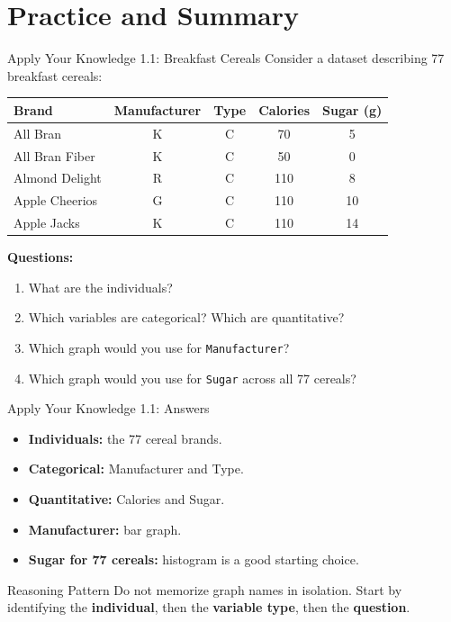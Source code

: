 \documentclass[aspectratio=169]{beamer}
\begin{document}
\section{Practice and Summary}

\begin{frame}{Apply Your Knowledge 1.1: Breakfast Cereals}
  Consider a dataset describing 77 breakfast cereals:
  \begin{table}
    \centering
    \small
    \begin{tabular}{lcccc}
      \toprule
      \textbf{Brand} & \textbf{Manufacturer} & \textbf{Type} & \textbf{Calories} & \textbf{Sugar (g)} \\
      \midrule
      All Bran & K & C & 70 & 5 \\
      All Bran Fiber & K & C & 50 & 0 \\
      Almond Delight & R & C & 110 & 8 \\
      Apple Cheerios & G & C & 110 & 10 \\
      Apple Jacks & K & C & 110 & 14 \\
      \bottomrule
    \end{tabular}
  \end{table}
  \small
  \textbf{Questions:}
  \begin{enumerate}
    \item What are the individuals?
    \item Which variables are categorical? Which are quantitative?
    \item Which graph would you use for \texttt{Manufacturer}?
    \item Which graph would you use for \texttt{Sugar} across all 77 cereals?
  \end{enumerate}
\end{frame}

\begin{frame}{Apply Your Knowledge 1.1: Answers}
  \begin{itemize}
    \item \textbf{Individuals:} the 77 cereal brands.
    \item \textbf{Categorical:} Manufacturer and Type.
    \item \textbf{Quantitative:} Calories and Sugar.
    \item \textbf{Manufacturer:} bar graph.
    \item \textbf{Sugar for 77 cereals:} histogram is a good starting choice.
  \end{itemize}
  \vspace{0.2cm}
  \begin{block}{Reasoning Pattern}
    Do not memorize graph names in isolation. Start by identifying the \textbf{individual}, then the \textbf{variable type}, then the \textbf{question}.
  \end{block}
\end{frame}
\end{document}
